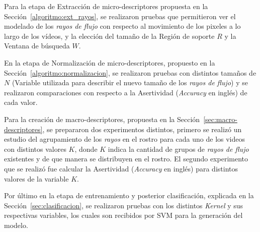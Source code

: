 Para la etapa de Extracción de micro-descriptores propuesta en la Sección~\ref{algoritmo:ext_rayos}, se realizaron pruebas que permitieron ver el modelado de los \textit{rayos de flujo} con respecto al movimiento de los pixeles a lo largo de los vídeos, y la elección del tamaño de la Región de soporte $R$ y la Ventana de búsqueda $W$.

En la etapa de Normalización de micro-descriptores, propuesto en la Sección~\ref{algoritmo:normalizacion}, se realizaron pruebas con distintos tamaños de $N$ (Variable utilizada para describir el nuevo tamaño de los \textit{rayos de flujo}) y se realizaron comparaciones con respecto a la Asertividad (\textit{Accuracy} en inglés) de cada valor.

Para la creación de macro-descriptores, propuesta en la Sección~\ref{sec:macro-descriptores}, se prepararon dos experimentos distintos, primero se realizó un estudio del agrupamiento de los \textit{rayos} en el rostro para cada uno de los videos con distintos valores $K$, donde $K$ indica la cantidad de grupos de \textit{rayos de flujo} existentes y de que manera se distribuyen en el rostro. El segundo experimento que se realizó fue calcular la Asertividad (\textit{Accuracy} en inglés) para distintos valores de la variable $K$.

Por último en la etapa de entrenamiento y posterior clasificación, explicada en la Sección~\ref{sec:clasificacion}, se realizaron pruebas con los distintos \textit{Kernel} y sus respectivas variables, los cuales son recibidos por SVM para la generación del modelo.


